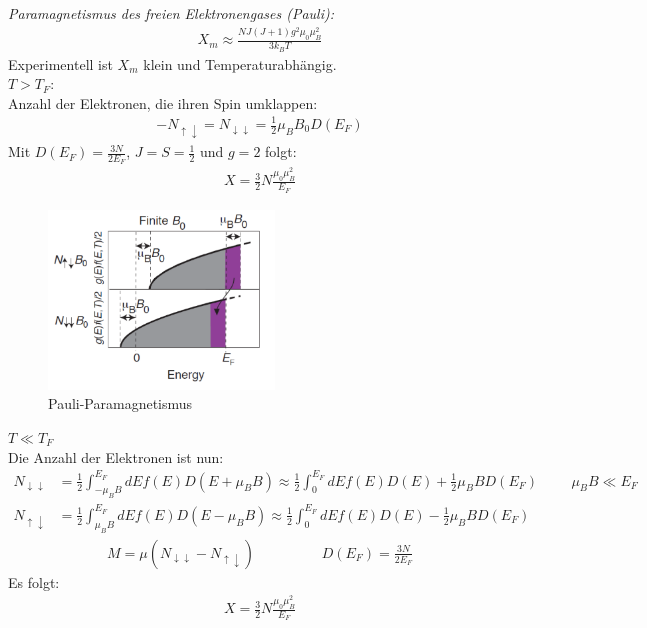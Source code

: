 \textit{Paramagnetismus des freien Elektronengases (Pauli):}\\
\begin{align}
    X_m \approx \frac{N J (J+1) g^2 \mu _0 \mu _B^2}{3 k_B T}
\end{align}
Experimentell ist $X_m$ klein und Temperaturabhängig. \bigskip\\

$T> T_F$:\\
Anzahl der Elektronen, die ihren Spin umklappen:
\begin{align}
    -N_{\uparrow \downarrow} = N_{\downarrow \downarrow} = \frac{1}{2} \mu_B B_0 D(E_F)
\end{align}
Mit $D(E_F) = \frac{3N}{2E_F}$, $J=S=\frac{1}{2}$ und $g=2$ folgt:
\begin{align}
    X = \frac{3}{2} N \frac{\mu_0 \mu_B^2}{E_F}
\end{align}

\begin{figure}[H]
    \centering
    \includegraphics[width=6cm]{resources/05-05-2015/Frage32_Pauli_Paramagnetismus.PNG}
    \caption{Pauli-Paramagnetismus}
\end{figure}

$T \ll T_F$\\
Die Anzahl der Elektronen ist nun:
\begin{align}
    N_{\downarrow \downarrow} &= \frac{1}{2} \int _{-\mu_B B} ^{E_F} dE f(E) D(E+ \mu_B B) \approx \frac{1}{2} \int_0 ^{E_F} dE f(E) D(E) + \frac{1}{2} \mu_B B D(E_F) \hspace{1cm} \mu_B B \ll E_F \\
    N_{\uparrow \downarrow} &= \frac{1}{2} \int _{\mu_B B} ^{E_F} dE f(E) D(E- \mu_B B) \approx \frac{1}{2} \int_0 ^{E_F} dE f(E) D(E) - \frac{1}{2} \mu_B B D(E_F) 
\end{align}
\begin{align}
    M = \mu (N_{\downarrow \downarrow} - N_{\uparrow \downarrow}) \hspace{2cm} D(E_F) = \frac{3N}{2 E_F}
\end{align}
Es folgt:
\begin{align}
    X = \frac{3}{2} N \frac{\mu_0 \mu_B^2}{E_F}
\end{align}


